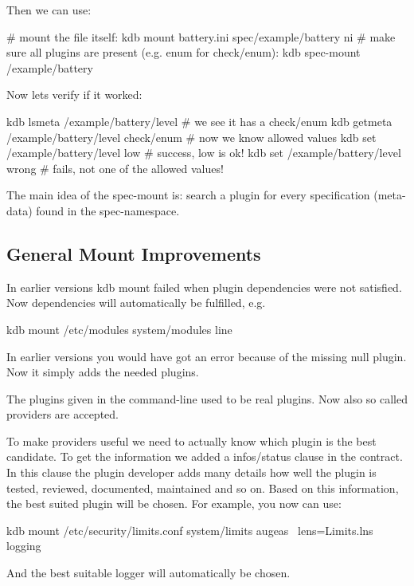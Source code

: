 Then we can use\+: \begin{DoxyVerb}    # mount the file itself:
    kdb mount battery.ini spec/example/battery ni
    # make sure all plugins are present (e.g. enum for check/enum):
    kdb spec-mount /example/battery
\end{DoxyVerb}


Now lets verify if it worked\+: \begin{DoxyVerb}    kdb lsmeta /example/battery/level
    # we see it has a check/enum
    kdb getmeta /example/battery/level check/enum
    # now we know allowed values
    kdb set /example/battery/level low
    # success, low is ok!
    kdb set /example/battery/level wrong
    # fails, not one of the allowed values!
\end{DoxyVerb}


The main idea of the spec-\/mount is\+: search a plugin for every specification (meta-\/data) found in the spec-\/namespace.

\subsection*{General Mount Improvements}

In earlier versions {\ttfamily kdb mount} failed when plugin dependencies were not satisfied. Now dependencies will automatically be fulfilled, e.\+g. \begin{DoxyVerb}    kdb mount /etc/modules system/modules line
\end{DoxyVerb}


In earlier versions you would have got an error because of the missing {\ttfamily null} plugin. Now it simply adds the needed plugins.

The plugins given in the command-\/line used to be real plugins. Now also so called providers are accepted.

To make providers useful we need to actually know which plugin is the best candidate. To get the information we added a {\ttfamily infos/status} clause in the contract. In this clause the plugin developer adds many details how well the plugin is tested, reviewed, documented, maintained and so on. Based on this information, the best suited plugin will be chosen. For example, you now can use\+: \begin{DoxyVerb}    kdb mount /etc/security/limits.conf system/limits augeas \
            lens=Limits.lns logging
\end{DoxyVerb}


And the best suitable logger will automatically be chosen.

